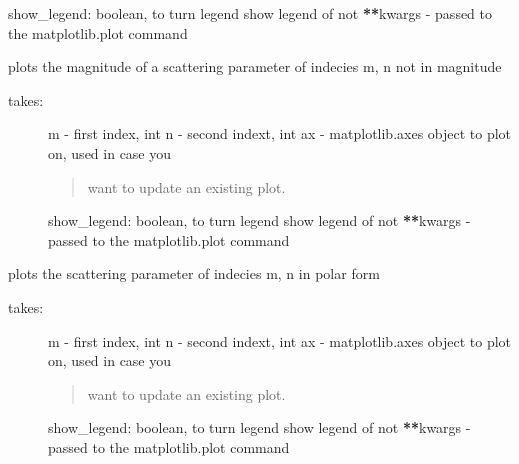 \documentclass[letterpaper,10pt,english]{sphinxmanual}
\begin{document}
\begin{fulllineitems}
\begin{fulllineitems}
\begin{description}
show\_legend: boolean, to turn legend show legend of not
{\color{red}\bfseries{}**}kwargs - passed to the matplotlib.plot command

\end{description}

\end{fulllineitems}


\begin{fulllineitems}
\label{auto_network:mwavepy.Network.plot_s_mag}
plots the magnitude of a scattering parameter of indecies m, n
not in  magnitude
\begin{description}
\item[{takes:}] \leavevmode
m - first index, int
n - second indext, int
ax - matplotlib.axes object to plot on, used in case you
\begin{quote}

want to update an existing plot.
\end{quote}

show\_legend: boolean, to turn legend show legend of not
{\color{red}\bfseries{}**}kwargs - passed to the matplotlib.plot command

\end{description}

\end{fulllineitems}


\begin{fulllineitems}
\label{auto_network:mwavepy.Network.plot_s_polar}
plots the scattering parameter of indecies m, n in polar form
\begin{description}
\item[{takes:}] \leavevmode
m - first index, int
n - second indext, int
ax - matplotlib.axes object to plot on, used in case you
\begin{quote}

want to update an existing plot.
\end{quote}

show\_legend: boolean, to turn legend show legend of not
{\color{red}\bfseries{}**}kwargs - passed to the matplotlib.plot command


\end{description}
\end{fulllineitems}
\end{fulllineitems}
\end{document}
